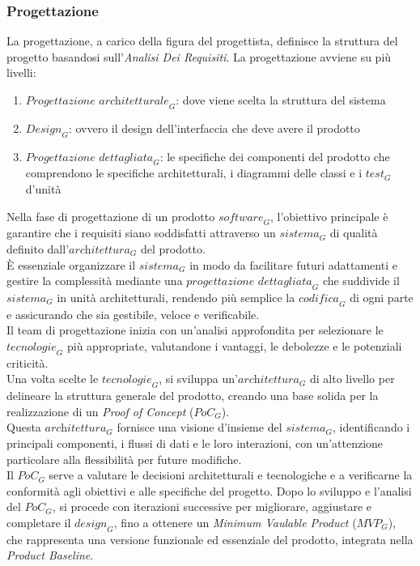 \subsubsection{Progettazione}
La progettazione, a carico della figura del progettista, definisce la struttura del progetto basandosi sull'\textit{Analisi Dei Requisiti}.
La progettazione avviene su più livelli:
\begin{enumerate}
    \item $\textit{Progettazione architetturale}_G$: dove viene scelta la struttura del sistema
    \item $\textit{Design}_G$: ovvero il design dell'interfaccia che deve avere il prodotto
    \item $\textit{Progettazione dettagliata}_G$: le specifiche dei componenti del prodotto che comprendono le specifiche architetturali, i diagrammi delle classi e i $\textit{test}_G$ d'unità
\end{enumerate}

Nella fase di progettazione di un prodotto $\textit{software}_G$, l'obiettivo principale è garantire che i requisiti siano soddisfatti attraverso un $\textit{sistema}_G$ di qualità definito dall'$\textit{architettura}_G$ del prodotto. 
\\È essenziale organizzare il $\textit{sistema}_G$ in modo da facilitare futuri adattamenti e gestire la complessità mediante una $\textit{progettazione dettagliata}_G$ che suddivide il $\textit{sistema}_G$ in unità architetturali, rendendo più semplice la $\textit{codifica}_G$ di ogni parte e assicurando che sia gestibile, veloce e verificabile.
\\Il team di progettazione inizia con un'analisi approfondita per selezionare le $\textit{tecnologie}_G$ più appropriate, valutandone i vantaggi, le debolezze e le potenziali criticità. 
\\Una volta scelte le $\textit{tecnologie}_G$, si sviluppa un'$\textit{architettura}_G$ di alto livello per delineare la struttura generale del prodotto, creando una base solida per la realizzazione di un \textit{Proof of Concept} ($\textit{PoC}_G$). 
\\Questa $\textit{architettura}_G$ fornisce una visione d'insieme del $\textit{sistema}_G$, identificando i principali componenti, i flussi di dati e le loro interazioni, con un'attenzione particolare alla flessibilità per future modifiche. 
\\Il $\textit{PoC}_G$ serve a valutare le decisioni architetturali e tecnologiche e a verificarne la conformità agli obiettivi e alle specifiche del progetto. Dopo lo sviluppo e l'analisi del $\textit{PoC}_G$, si procede con iterazioni successive per migliorare, aggiustare e completare il $\textit{design}_G$, fino a ottenere un \textit{Minimum Vaulable Product} ($\textit{MVP}_G$), che rappresenta una versione funzionale ed essenziale del prodotto, integrata nella \textit{Product Baseline}.

